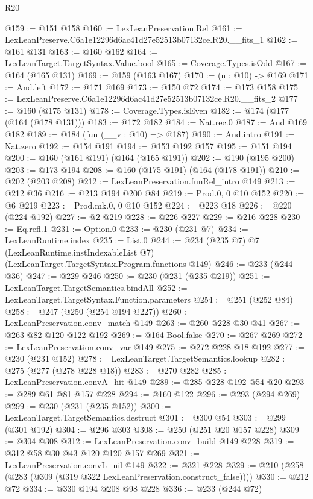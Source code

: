 \begin{lexlean}{R20}
\begin{coremodule}
@159 := @151 @158
@160 := LexLeanPreservation.Rel
@161 := LexLeanPreserve.C6a1e12296d6ac41d27e52513b07132ce.R20.__fits_1
@162 := @161 @131
@163 := @160 @162
@164 := LexLeanTarget.TargetSyntax.Value.bool
@165 := Coverage.Types.isOdd
@167 := @164 (@165 @131)
@169 := @159 (@163 @167)
@170 := (n : @10) -> @169
@171 := And.left
@172 := @171 @169
@173 := @150 @72
@174 := @173 @158
@175 := LexLeanPreserve.C6a1e12296d6ac41d27e52513b07132ce.R20.__fits_2
@177 := @160 (@175 @131)
@178 := Coverage.Types.isEven
@182 := @174 (@177 (@164 (@178 @131)))
@183 := @172 @182
@184 := Nat.rec.{0}
@187 := And @169 @182
@189 := @184 (fun (__v : @10) => @187)
@190 := And.intro
@191 := Nat.zero
@192 := @154 @191
@194 := @153 @192 @157
@195 := @151 @194
@200 := @160 (@161 @191) (@164 (@165 @191))
@202 := @190 (@195 @200)
@203 := @173 @194
@208 := @160 (@175 @191) (@164 (@178 @191))
@210 := @202 (@203 @208)
@212 := LexLeanPreservation.funRel_intro @149
@213 := @212 @36
@216 := @213 @194 @200 @84
@219 := Prod.{0, 0} @10 @152
@220 := @6 @219
@223 := Prod.mk.{0, 0} @10 @152
@224 := @223 @18
@226 := @220 (@224 @192)
@227 := @2 @219
@228 := @226 @227
@229 := @216 @228
@230 := Eq.refl.{1}
@231 := Option.{0}
@233 := @230 (@231 @7)
@234 := LexLeanRuntime.index
@235 := List.{0}
@244 := @234
    (@235 @7)
    @7
    (LexLeanRuntime.instIndexableList @7)
    (LexLeanTarget.TargetSyntax.Program.functions @149)
@246 := @233 (@244 @36)
@247 := @229 @246
@250 := @230 (@231 (@235 @219))
@251 := LexLeanTarget.TargetSemantics.bindAll
@252 := LexLeanTarget.TargetSyntax.Function.parameters
@254 := @251 (@252 @84)
@258 := @247 (@250 (@254 @194 @227))
@260 := LexLeanPreservation.conv_match @149
@263 := @260 @228 @30 @41
@267 := @263 @82 @120 @122 @192
@269 := @164 Bool.false
@270 := @267 @269
@272 := LexLeanPreservation.conv_var @149
@275 := @272 @228 @18 @192
@277 := @230 (@231 @152)
@278 := LexLeanTarget.TargetSemantics.lookup
@282 := @275 (@277 (@278 @228 @18))
@283 := @270 @282
@285 := LexLeanPreservation.convA_hit @149
@289 := @285 @228 @192 @54 @20
@293 := @289 @61 @81 @157 @228
@294 := @160 @122
@296 := @293 (@294 @269)
@299 := @230 (@231 (@235 @152))
@300 := LexLeanTarget.TargetSemantics.destruct
@301 := @300 @54
@303 := @299 (@301 @192)
@304 := @296 @303
@308 := @250 (@251 @20 @157 @228)
@309 := @304 @308
@312 := LexLeanPreservation.conv_build @149 @228
@319 := @312 @58 @30 @43 @120 @120 @157 @269
@321 := LexLeanPreservation.convL_nil @149
@322 := @321 @228
@329 := @210 (@258 (@283 (@309 (@319 @322 LexLeanPreservation.construct_false))))
@330 := @212 @72
@334 := @330 @194 @208 @98 @228
@336 := @233 (@244 @72)

\end{coremodule}
\end{lexlean}
